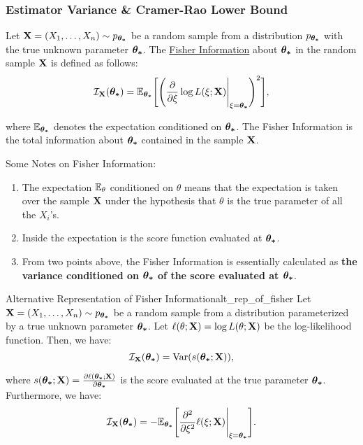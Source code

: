 \subsubsection{Estimator Variance \& Cramer-Rao Lower Bound}
\begin{definition}
    Let ${\bf X}=(X_1, \dots, X_n) \sim p_{\boldsymbol{\theta_*}}$ be a random sample from a distribution $p_{\boldsymbol{\theta_*}}$ with the true unknown parameter $\boldsymbol{\theta_*}$. The \underline{Fisher Information} about $\boldsymbol{\theta_*}$ in the random sample ${\bf X}$ is defined as follows:
    \begin{equation}
        \mathcal{I}_{\bf X}(\boldsymbol{\theta_*}) = \mathbb{E}_{\boldsymbol{\theta_*}}\Bigg[ 
            \Bigg( 
                \frac{\partial}{\partial\xi}\log L(\xi;{\bf X})\Bigg|_{\xi=\boldsymbol{\theta_*}}
             \Bigg)^2
         \Bigg],
    \end{equation}

    \noindent where $\mathbb{E}_{\boldsymbol{\theta_*}}$ denotes the expectation conditioned on $\boldsymbol{\theta_*}$. The Fisher Information is the total information about $\boldsymbol{\theta_*}$ contained in the sample ${\bf X}$.
\end{definition}

\begin{remark}
    Some Notes on Fisher Information:
    \begin{enumerate}
        \item The expectation $\mathbb{E}_\theta$ conditioned on $\theta$ means that the expectation is taken over the sample ${\bf X}$ under the hypothesis that $\theta$ is the true parameter of all the $X_i$'s. 

        \item Inside the expectation is the score function evaluated at $\boldsymbol{\theta_*}$.
        \item From two points above, the Fisher Information is essentially calculated as \textbf{the variance conditioned on $\boldsymbol{\theta_*}$ of the score evaluated at $\boldsymbol{\theta_*}$}.
    \end{enumerate} 
\end{remark} 

\begin{proposition}{Alternative Representation of Fisher Information}{alt_rep_of_fisher}
    Let ${\bf X}=(X_1, \dots, X_n) \sim p_{\boldsymbol{\theta_*}}$ be a random sample from a distribution parameterized by a true unknown parameter $\boldsymbol{\theta_*}$. Let $\ell(\theta;{\bf X})=\log L(\theta;{\bf X})$ be the log-likelihood function. Then, we have:
    \begin{equation}
        \mathcal{I}_{{\bf X}}(\boldsymbol{\theta_*}) = \mathrm{Var}(s(\boldsymbol{\theta_*};{\bf X})), 
    \end{equation} 

    \noindent where $s(\boldsymbol{\theta_*};{\bf X})=\frac{\partial\ell(\boldsymbol{\theta_*};{\bf X})}{\partial\boldsymbol{\theta_*}}$ is the score evaluated at the true parameter $\boldsymbol{\theta_*}$. Furthermore, we have:
    \begin{equation}
        \mathcal{I}_{{\bf X}}(\boldsymbol{\theta_*}) = -\mathbb{E}_{\boldsymbol{\theta_*}}\Bigg[ \frac{\partial^2}{\partial\xi^2}\ell(\xi;{\bf X})\Bigg|_{\xi=\boldsymbol{\theta_*}} \Bigg].
    \end{equation} 
\end{proposition} 

